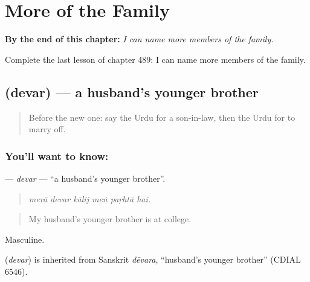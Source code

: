 
\chapter{More of the Family}
\label{ch:ur-more-of-the-family}

\begin{chapteropening}
\textbf{By the end of this chapter:} \emph{I can name more members of the family.}

Complete the last lesson of chapter 489: I can name more members of the family.
\end{chapteropening}

\section[\texorpdfstring{\ur{دیور} (devar)}{دیور (devar)}]{ (devar) — a husband's younger brother}

\label{lesson:UR-C489-devar}



\begin{quote}
Before the new one: say the Urdu for a son-in-law, then the Urdu for to marry off.
\end{quote}

\subsection*{You'll want to know: }
\textbf{} — \emph{devar} — \textquotedblleft{}a husband's younger brother\textquotedblright{}.

\begin{quote}
     
\end{quote}

\begin{quote}
\emph{merā devar kālij meṅ paṛhtā hai.}
\end{quote}

\begin{quote}
My husband's younger brother is at college.
\end{quote}

Masculine.

\begin{cousinweb}
\textbf{} (\emph{devar}) is inherited from Sanskrit \emph{dēvara}, \textquotedblleft{}husband's younger brother\textquotedblright{} (CDIAL 6546).
\end{cousinweb}

